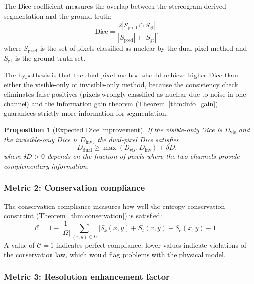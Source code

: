 \documentclass[11pt,twocolumn,a4paper]{article}
\newtheorem{proposition}[theorem]{Proposition}
\newcommand{\Sk}{S_k}
\newcommand{\St}{S_t}
\newcommand{\Se}{S_e}
\begin{document}
The Dice coefficient measures the overlap between the stereogram-derived segmentation and the ground truth:
\begin{equation}\label{eq:dice}
\mathrm{Dice} = \frac{2|S_{\mathrm{pred}} \cap S_{\mathrm{gt}}|}{|S_{\mathrm{pred}}| + |S_{\mathrm{gt}}|},
\end{equation}
where $S_{\mathrm{pred}}$ is the set of pixels classified as nuclear by the dual-pixel method and $S_{\mathrm{gt}}$ is the ground-truth set.

The hypothesis is that the dual-pixel method should achieve higher Dice than either the visible-only or invisible-only method, because the consistency check eliminates false positives (pixels wrongly classified as nuclear due to noise in one channel) and the information gain theorem (Theorem~\ref{thm:info_gain}) guarantees strictly more information for segmentation.

\begin{proposition}[Expected Dice improvement]\label{prop:dice}
If the visible-only Dice is $D_{\mathrm{vis}}$ and the invisible-only Dice is $D_{\mathrm{inv}}$, the dual-pixel Dice satisfies
\begin{equation}\label{eq:dice_improvement}
D_{\mathrm{dual}} \geq \max(D_{\mathrm{vis}}, D_{\mathrm{inv}}) + \delta D,
\end{equation}
where $\delta D > 0$ depends on the fraction of pixels where the two channels provide complementary information.
\end{proposition}

\subsubsection{Metric 2: Conservation compliance}

The conservation compliance measures how well the entropy conservation constraint (Theorem~\ref{thm:conservation}) is satisfied:
\begin{equation}\label{eq:compliance}
\mathcal{C} = 1 - \frac{1}{|\Omega|}\sum_{(x,y) \in \Omega} |\Sk(x,y) + \St(x,y) + \Se(x,y) - 1|.
\end{equation}
A value of $\mathcal{C} = 1$ indicates perfect compliance; lower values indicate violations of the conservation law, which would flag problems with the physical model.

\subsubsection{Metric 3: Resolution enhancement factor}
\end{document}
